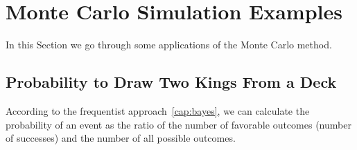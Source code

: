 %
%
%

\section{Monte Carlo Simulation Examples}
\label{example-of-monte-carlo-simulation}

In this Section we go through some applications of the Monte Carlo method.

\subsection{Probability to Draw Two Kings From a Deck}
According to the frequentist approach~\ref{cap:bayes}, we can calculate the probability of an event as the ratio of the number of favorable outcomes (number of successes) and the number of all possible outcomes. 

